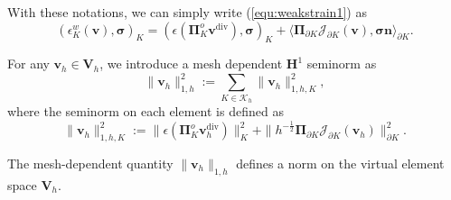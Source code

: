 \documentclass[review,hidelinks,onefignum,onetabnum]{siamart251216}
\begin{document}
With these notations, we can simply write (\ref{equ:weakstrain1}) as
\[
(\epsilon_K^w(\boldsymbol{v}), \boldsymbol{\sigma})_K = (\epsilon(\boldsymbol{\Pi}_K^o \boldsymbol{v}^{\operatorname{div}}), \boldsymbol{\sigma})_K + \langle \boldsymbol{\Pi}_{\partial K} \mathcal{J}_{\partial K}(\boldsymbol{v}), \boldsymbol{\sigma}\boldsymbol{n} \rangle_{\partial K}.
\]


For any \(\boldsymbol{v}_h \in \boldsymbol{V}_h\), we introduce a mesh dependent \(\boldsymbol{H}^1\) seminorm as
\[
\|\boldsymbol{v}_h\|_{1,h}^2 := \sum_{K \in \mathcal{K}_h} \|\boldsymbol{v}_h\|_{1,h,K}^2,
\]
where the seminorm on each element is defined as
\[
\|\boldsymbol{v}_h\|_{1,h,K}^2 := \|\epsilon (\boldsymbol{\Pi}_K^o \boldsymbol{v}_h^{\operatorname{div}})\|_K^2 + \|h^{-\frac{1}{2}}  \boldsymbol{\Pi}_{\partial K}\mathcal{J}_{\partial K}(\boldsymbol{v}_h)\|_{\partial K}^2.
\]


\begin{lemma}\label{lem:norm}
The mesh-dependent quantity
\(
\|\boldsymbol{v}_h\|_{1,h}
\)
defines a norm on the virtual element space \(\boldsymbol{V}_h\).
\end{lemma}
\end{document}
